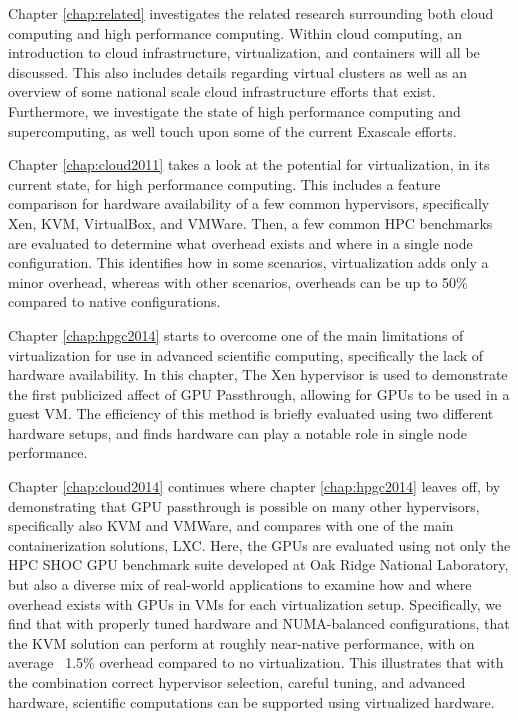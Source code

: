 Chapter \ref{chap:related} investigates the related research surrounding both cloud computing and high performance computing. Within cloud computing, an introduction to cloud infrastructure, virtualization, and containers will all be discussed. This also includes details regarding virtual clusters as well as an overview of some national scale cloud infrastructure efforts that exist. Furthermore, we investigate the state of high performance computing and supercomputing, as well touch upon some of the current Exascale efforts.

Chapter \ref{chap:cloud2011} takes a look at the potential for virtualization, in its current state, for high performance computing. This includes a feature comparison for hardware availability of a few common hypervisors, specifically Xen, KVM, VirtualBox, and VMWare. Then, a few common HPC benchmarks are evaluated to determine what overhead exists and where in a single node configuration. This identifies how in some scenarios, virtualization adds only a minor overhead, whereas with other scenarios, overheads can be up to 50\% compared to native configurations. 

Chapter \ref{chap:hpgc2014} starts to overcome one of the main limitations of virtualization for use in advanced scientific computing, specifically the lack of hardware availability. In this chapter, The Xen hypervisor is used to demonstrate the first publicized affect of GPU Passthrough, allowing for GPUs to be used in a guest VM. The efficiency of this method is briefly evaluated using two different hardware setups, and finds hardware can play a notable role in single node performance. 

Chapter \ref{chap:cloud2014} continues where chapter \ref{chap:hpgc2014} leaves off, by demonstrating that GPU passthrough is possible on many other hypervisors, specifically also KVM and VMWare, and compares with one of the main containerization solutions, LXC. Here, the GPUs are evaluated using not only the HPC SHOC GPU benchmark suite developed at Oak Ridge National Laboratory, but also a diverse mix of real-world applications to examine how and where overhead exists with GPUs in VMs for each virtualization setup.  Specifically, we find that with properly tuned hardware and NUMA-balanced configurations, that the KVM solution can perform at roughly near-native performance, with on average ~1.5\% overhead compared to no virtualization. This illustrates that with the combination correct hypervisor selection, careful tuning, and advanced hardware, scientific computations can be supported using virtualized hardware. 

